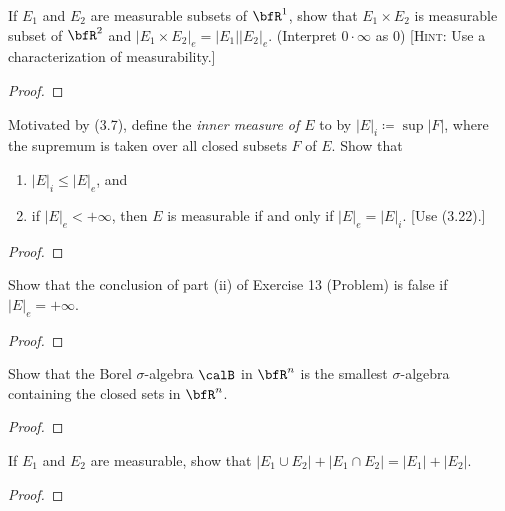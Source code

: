 \begin{problem}
If $E_1$ and $E_2$ are measurable subsets of $\bfR^1$, show that $E_1\times
E_2$ is measurable subset of $\bfR^2$ and $\left|E_1\times
  E_2\right|_e=\left|E_1\right|\left|E_2\right|_e$. (Interpret
$0\cdot\infty$ as $0$) [\textsc{Hint:} Use a characterization of
measurability.]
\end{problem}
\begin{proof}
\end{proof}
\newpage

\begin{problem}
Motivated by (3.7), define the \emph{inner measure of $E$} to by
$\left|E\right|_i\coloneqq\sup\left|F\right|$, where the supremum is taken
over all closed subsets $F$ of $E$. Show that
\begin{enumerate}[label=(\roman*)]
\item $\left|E\right|_i\leq\left|E\right|_e$, and
\item if $\left|E\right|_e<+\infty$, then $E$ is measurable if and only if
  $\left|E\right|_e=\left|E\right|_i$. [Use (3.22).]
\end{enumerate}

\end{problem}
\begin{proof}
\end{proof}
\newpage

\begin{problem}
Show that the conclusion of part  (ii) of Exercise 13 (Problem) is false if
$\left|E\right|_e=+\infty$.
\end{problem}
\begin{proof}
\end{proof}
\newpage

\begin{problem}
Show that the Borel $\sigma$-algebra $\calB$ in $\bfR^n$ is the smallest
$\sigma$-algebra containing the closed sets in $\bfR^n$.
\end{problem}
\begin{proof}
\end{proof}
\newpage

\begin{problem}
If $E_1$ and $E_2$ are measurable, show that $\left|E_1\cup
  E_2\right|+\left|E_1\cap E_2\right|=\left|E_1\right|+\left|E_2\right|$.
\end{problem}
\begin{proof}
\end{proof}
\newpage

